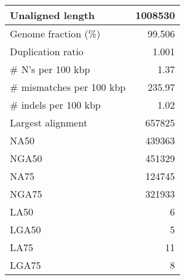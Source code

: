 \documentclass[12pt,a4paper]{article}
\begin{document}
\begin{table}[ht]
\begin{center}
\begin{tabular}{|l*{1}{|r}|}
Unaligned length & 1008530 \\ \hline
Genome fraction (\%) & 99.506 \\ \hline
Duplication ratio & 1.001 \\ \hline
\# N's per 100 kbp & 1.37 \\ \hline
\# mismatches per 100 kbp & 235.97 \\ \hline
\# indels per 100 kbp & 1.02 \\ \hline
Largest alignment & 657825 \\ \hline
NA50 & 439363 \\ \hline
NGA50 & 451329 \\ \hline
NA75 & 124745 \\ \hline
NGA75 & 321933 \\ \hline
LA50 & 6 \\ \hline
LGA50 & 5 \\ \hline
LA75 & 11 \\ \hline
LGA75 & 8 \\ \hline
\end{tabular}
\end{center}
\end{table}
\end{document}
